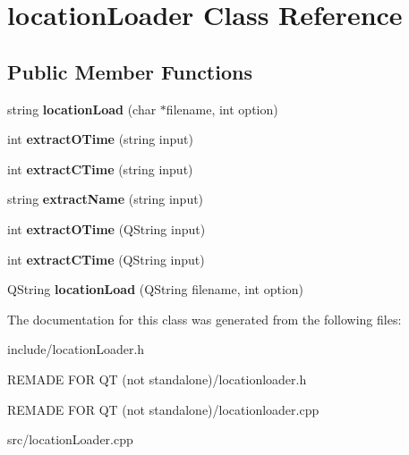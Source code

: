 \hypertarget{classlocation_loader}{\section{location\-Loader Class Reference}
\label{classlocation_loader}
}
\subsection*{Public Member Functions}
\begin{DoxyCompactItemize}
\item 
\hypertarget{classlocation_loader_a74cd7af4aead43b9f386c6380ec6d0d1}{string {\bfseries location\-Load} (char $\ast$filename, int option)}\label{classlocation_loader_a74cd7af4aead43b9f386c6380ec6d0d1}

\item 
\hypertarget{classlocation_loader_a92c33524e9b6ad3e4eba63fd4bc2ec13}{int {\bfseries extract\-O\-Time} (string input)}\label{classlocation_loader_a92c33524e9b6ad3e4eba63fd4bc2ec13}

\item 
\hypertarget{classlocation_loader_ab513c5f807626e249e9b6d8e4006c808}{int {\bfseries extract\-C\-Time} (string input)}\label{classlocation_loader_ab513c5f807626e249e9b6d8e4006c808}

\item 
\hypertarget{classlocation_loader_a022375124026162ddeb9cc6f2060f033}{string {\bfseries extract\-Name} (string input)}\label{classlocation_loader_a022375124026162ddeb9cc6f2060f033}

\item 
\hypertarget{classlocation_loader_ac04f41072f73e10521abd3b320d3b345}{int {\bfseries extract\-O\-Time} (Q\-String input)}\label{classlocation_loader_ac04f41072f73e10521abd3b320d3b345}

\item 
\hypertarget{classlocation_loader_a8067d9ac015d2973deeb0f0ba13c0c8a}{int {\bfseries extract\-C\-Time} (Q\-String input)}\label{classlocation_loader_a8067d9ac015d2973deeb0f0ba13c0c8a}

\item 
\hypertarget{classlocation_loader_ae3c8d2242868ca7dd3ee02c77f77fdbe}{Q\-String {\bfseries location\-Load} (Q\-String filename, int option)}\label{classlocation_loader_ae3c8d2242868ca7dd3ee02c77f77fdbe}

\end{DoxyCompactItemize}


The documentation for this class was generated from the following files\-:\begin{DoxyCompactItemize}
\item 
include/location\-Loader.\-h\item 
R\-E\-M\-A\-D\-E F\-O\-R Q\-T (not standalone)/locationloader.\-h\item 
R\-E\-M\-A\-D\-E F\-O\-R Q\-T (not standalone)/locationloader.\-cpp\item 
src/location\-Loader.\-cpp\end{DoxyCompactItemize}
